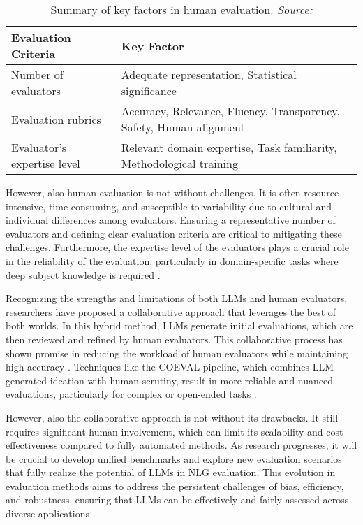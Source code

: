 \begin{table}[h!]
\centering
\begin{tabular}{|p{4cm}|p{8cm}|}
\hline
\textbf{Evaluation Criteria} & \textbf{Key Factor} \\ \hline
Number of evaluators & Adequate representation, Statistical significance \\ \hline
Evaluation rubrics & Accuracy, Relevance, Fluency, Transparency, \newline Safety, Human alignment \\ \hline
Evaluator’s expertise level & Relevant domain expertise, Task familiarity, \newline Methodological training \\ \hline
\end{tabular}
\caption{Summary of key factors in human evaluation. \textit{Source:} \cite{chang2024survey}}
\end{table}
However, also human evaluation is not without challenges. It is often resource-intensive, time-consuming, and susceptible to variability due to cultural and individual differences among evaluators. Ensuring a representative number of evaluators and defining clear evaluation criteria are critical to mitigating these challenges. Furthermore, the expertise level of the evaluators plays a crucial role in the reliability of the evaluation, particularly in domain-specific tasks where deep subject knowledge is required \cite{chang2024survey}.

Recognizing the strengths and limitations of both LLMs and human evaluators, researchers have proposed a collaborative approach that leverages the best of both worlds. In this hybrid method, LLMs generate initial evaluations, which are then reviewed and refined by human evaluators. This collaborative process has shown promise in reducing the workload of human evaluators while maintaining high accuracy \cite{li2023collaborative}. Techniques like the COEVAL pipeline, which combines LLM-generated ideation with human scrutiny, result in more reliable and nuanced evaluations, particularly for complex or open-ended tasks \cite{zhang2021human}.

However, also the collaborative approach is not without its drawbacks. It still requires significant human involvement, which can limit its scalability and cost-effectiveness compared to fully automated methods. As research progresses, it will be crucial to develop unified benchmarks and explore new evaluation scenarios that fully realize the potential of LLMs in NLG evaluation. This evolution in evaluation methods aims to address the persistent challenges of bias, efficiency, and robustness, ensuring that LLMs can be effectively and fairly assessed across diverse applications \cite{gao2023retrieval}.


